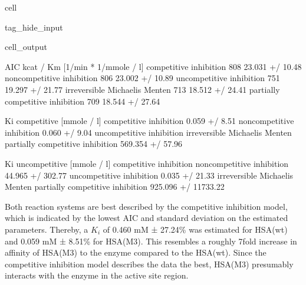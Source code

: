 \documentclass[letterpaper,10pt,english]{jupyterBook}
\begin{document}
\begin{sphinxuseclass}{cell}
\begin{sphinxuseclass}{tag_hide_input}
\begin{sphinxVerbatimOutput}
\begin{sphinxuseclass}{cell_output}
\begin{sphinxVerbatim}[commandchars=\\\{\}]
                                  AIC kcat / Km [1/min * 1/mmole / l]  \PYGZbs{}
competitive inhibition           \PYGZhy{}808               23.031 +/\PYGZhy{} 10.48\PYGZpc{}   
non\PYGZhy{}competitive inhibition       \PYGZhy{}806               23.002 +/\PYGZhy{} 10.89\PYGZpc{}   
uncompetitive inhibition         \PYGZhy{}751               19.297 +/\PYGZhy{} 21.77\PYGZpc{}   
irreversible Michaelis Menten    \PYGZhy{}713               18.512 +/\PYGZhy{} 24.41\PYGZpc{}   
partially competitive inhibition \PYGZhy{}709               18.544 +/\PYGZhy{} 27.64\PYGZpc{}   

                                 Ki competitive [mmole / l]  \PYGZbs{}
competitive inhibition                      0.059 +/\PYGZhy{} 8.51\PYGZpc{}   
non\PYGZhy{}competitive inhibition                  0.060 +/\PYGZhy{} 9.04\PYGZpc{}   
uncompetitive inhibition                                  \PYGZhy{}   
irreversible Michaelis Menten                             \PYGZhy{}   
partially competitive inhibition         569.354 +/\PYGZhy{} 57.96\PYGZpc{}   

                                 Ki uncompetitive [mmole / l]  
competitive inhibition                                      \PYGZhy{}  
non\PYGZhy{}competitive inhibition                 44.965 +/\PYGZhy{} 302.77\PYGZpc{}  
uncompetitive inhibition                     0.035 +/\PYGZhy{} 21.33\PYGZpc{}  
irreversible Michaelis Menten                               \PYGZhy{}  
partially competitive inhibition        925.096 +/\PYGZhy{} 11733.22\PYGZpc{}  
\end{sphinxVerbatim}

\noindent{}

\end{sphinxuseclass}\end{sphinxVerbatimOutput}

\end{sphinxuseclass}
\end{sphinxuseclass}
\sphinxAtStartPar
{}

\sphinxAtStartPar
Both reaction systems are best described by the competitive inhibition model, which is indicated by the lowest AIC and standard deviation on the estimated parameters. Thereby, a \(K_{i}\) of 0.460 mM ± 27.24\% was estimated for HSA(wt) and 0.059 mM ± 8.51\% for HSA(M3). This resembles a roughly 7\sphinxhyphen{}fold increase in affinity of HSA(M3) to the enzyme compared to the HSA(wt). Since the competitive inhibition model describes the data the best, HSA(M3) presumably interacts with the enzyme in the active site region.
\end{document}
